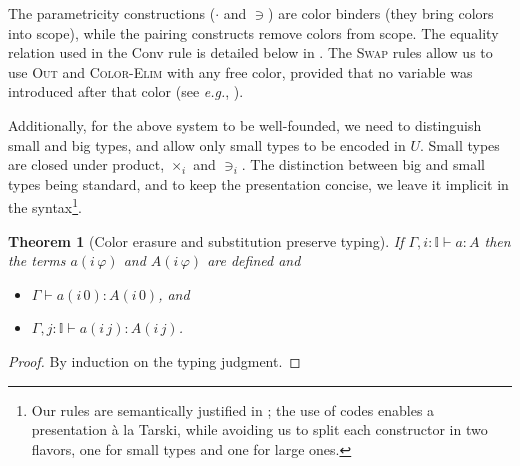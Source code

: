 \documentclass[english]{PaperTools/latex/entcs}
\theoremstyle{plain}
\newtheorem{theorem}{Theorem}
\theoremstyle{definition}
\newtheorem{definition}[theorem]{Definition}
\theoremstyle{remark}
\newcommand\CP[3]{(#2,_{#1} #3)}
\newcommand\CTimes[2]{(#2) ×_{#1}}
\newcommand\param[1]{\!\cdot\!#1}
\newcommand\op[1]{∋_{#1}}
\newcommand\fp[3]{⟨#2 ,_{#1} #3⟩}
\newcommand\comment[1]{}
\def\eg{\textit{e.g.}}
\begin{document}
The parametricity constructions ($·$ and $∋$) are color
binders (they bring colors into scope), while the pairing constructs
remove colors from scope.
The equality relation used in the {\sc Conv} rule is detailed below in
.  The \textsc{Swap} rules allow us to use
\textsc{Out} and \textsc{Color-Elim} with any free color, provided that
no variable was introduced after that color (see \eg, ).

Additionally, for the above system to be well-founded, we need to
distinguish small and big types, and allow only small types to be
encoded in $U$. Small types are closed under product, $×_i$ and
$∋_i$. The distinction between big and small types being standard, and
to keep the presentation concise, we leave it implicit in the
syntax\footnote{Our rules are semantically justified in
; the use of codes enables a presentation à la Tarski,
while avoiding us to split each constructor in two flavors, one for small
types and one for large ones.}.

\begin{theorem}[Color erasure and substitution preserve typing]
  If $Γ,i:𝕀  ⊢ a : A$ then the terms $a(i\,φ)$ and $A(i\,φ)$ are
  defined and
  \begin{itemize}
    \item $Γ ⊢ a(i\,0) : A(i\,0)$, and
    \item $Γ, j :𝕀 ⊢ a(i\,j) : A(i\,j)$.
  \end{itemize}
\end{theorem}
\begin{proof}
  By induction on the typing judgment.
\end{proof}

\comment{
\begin{definition}[Normal forms and neutral terms]~
  \begin{align*}
    \mathsf{Nf} ∋ u,v,A,B & \coloneqq
      U \mid λx:A. t \mid (x:A) → B \\
      & \mid \CP i u v \mid \fp i u v \\
      & \mid {(\CTimes {i₀} A B)} \op {i₁} {u_1 \cdots} \op {i_n} {u_n} &\quad \text{($i₀ \prec i₁ \prec \ldots \prec i_n$)} \\
      & \mid s \param {i₀} \cdots \param {i_{n-1}}                  &\quad \text{($i₀ \prec   < \ldots \prec i_{n-1}$)}
    \\
    \mathsf{Ne} ∋ s & \coloneqq x \mid s \, u
  \end{align*}
\end{definition}
}
\end{document}
